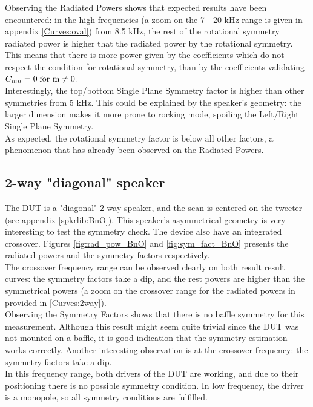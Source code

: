 \documentclass{report}
\begin{document}
Observing the Radiated Powers shows that expected results have been encountered: in the high frequencies (a zoom on the 7 - 20 kHz range is given in appendix \ref{Curves:oval}) from 8.5 kHz, the rest of the rotational symmetry radiated power is higher that the radiated power by the rotational symmetry. This means that there is more power given by the coefficients which do not respect the condition for rotational symmetry, than by the coefficients validating $C_{mn} = 0 \;  \textup{for m}  \neq 0$.  \\

Interestingly, the top/bottom Single Plane Symmetry factor is higher than other symmetries from 5 kHz. This could be explained by the speaker's geometry: the larger dimension makes it more prone to rocking mode, spoiling the Left/Right Single Plane Symmetry. \\
As expected, the rotational symmetry factor is below all other factors, a phenomenon that has already been observed on the Radiated Powers. 




\subsection{2-way "diagonal" speaker}

The DUT is a "diagonal" 2-way speaker, and the scan is centered on the tweeter (see appendix \ref{spkrlib:BnO}). This speaker's asymmetrical geometry is very interesting to test the symmetry check. The device also have an integrated crossover. Figures \ref{fig:rad_pow_BnO} and \ref{fig:sym_fact_BnO} presents the radiated powers and the symmetry factors respectively. \\

The crossover frequency range can be observed clearly on both result result curves: the symmetry factors take a dip, and the rest powers are higher than the symmetrical powers (a zoom on the crossover range for the radiated powers in provided in \ref{Curves:2way}).\\

Observing the Symmetry Factors shows that there is no baffle symmetry for this measurement. Although this result might seem quite trivial since the DUT was not mounted on a baffle, it is good indication that the symmetry estimation works correctly. Another interesting observation is at the crossover frequency: the symmetry factors take a dip. \\
In this frequency range, both drivers of the DUT are working, and due to their positioning there is no possible symmetry condition. In low frequency, the driver is a monopole, so all symmetry conditions are fulfilled.\\
\end{document}
